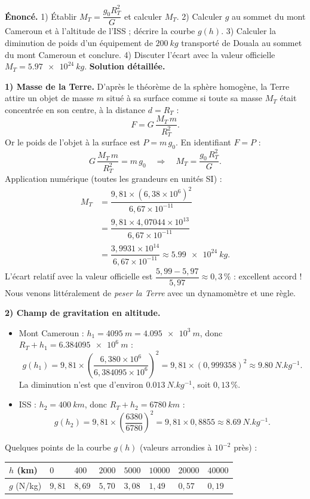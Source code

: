 \documentclass[11pt]{article}
\begin{document}
\begin{exoresolu}
\textbf{Énoncé.} 1) Établir $M_T = \dfrac{g_0 R_T^2}{G}$ et calculer $M_T$. 2) Calculer $g$ au sommet du mont Cameroun et à l'altitude de l'ISS ; décrire la courbe $g(h)$. 3) Calculer la diminution de poids d'un équipement de $\SI{200}{kg}$ transporté de Douala au sommet du mont Cameroun et conclure. 4) Discuter l'écart avec la valeur officielle $M_T = \SI{5,97e24}{kg}$.
\tcblower
\textbf{Solution détaillée.}

\textbf{1) Masse de la Terre.} D'après le théorème de la sphère homogène, la Terre attire un objet de masse $m$ situé à sa surface comme si toute sa masse $M_T$ était concentrée en son centre, à la distance $d = R_T$ :
\[ F = G\,\dfrac{M_T\,m}{R_T^2}. \]
Or le poids de l'objet à la surface est $P = m\,g_0$. En identifiant $F = P$ :
\[ G\,\dfrac{M_T\,m}{R_T^2} = m\,g_0 \quad \Longrightarrow \quad M_T = \dfrac{g_0\,R_T^2}{G}. \]
Application numérique (toutes les grandeurs en unités SI) :
\begin{align*}
M_T &= \dfrac{9{,}81 \times (6{,}38\times 10^{6})^2}{6{,}67\times 10^{-11}} \\
&= \dfrac{9{,}81 \times 4{,}07044\times 10^{13}}{6{,}67\times 10^{-11}} \\
&= \dfrac{3{,}9931\times 10^{14}}{6{,}67\times 10^{-11}} \approx \SI{5,99e24}{kg}.
\end{align*}
L'écart relatif avec la valeur officielle est $\dfrac{5{,}99-5{,}97}{5{,}97} \approx 0{,}3\,\%$ : excellent accord ! Nous venons littéralement de \emph{peser la Terre} avec un dynamomètre et une règle.

\textbf{2) Champ de gravitation en altitude.}
\begin{itemize}
\item Mont Cameroun : $h_1 = \SI{4095}{m} = \SI{4,095e3}{m}$, donc $R_T + h_1 = \SI{6,384095e6}{m}$ :
\[ g(h_1) = 9{,}81 \times \left(\dfrac{6{,}380\times 10^{6}}{6{,}384095\times 10^{6}}\right)^2 = 9{,}81 \times (0{,}999358)^2 \approx \SI{9,80}{N.kg^{-1}}. \]
La diminution n'est que d'environ $\SI{0,013}{N.kg^{-1}}$, soit $0{,}13\,\%$.
\item ISS : $h_2 = \SI{400}{km}$, donc $R_T + h_2 = \SI{6780}{km}$ :
\[ g(h_2) = 9{,}81 \times \left(\dfrac{6380}{6780}\right)^2 = 9{,}81 \times 0{,}8855 \approx \SI{8,69}{N.kg^{-1}}. \]
\end{itemize}
Quelques points de la courbe $g(h)$ (valeurs arrondies à $10^{-2}$ près) :

\begin{center}
\begin{tabularx}{\linewidth}{|l|X|X|X|X|X|X|X|}\hline
\rowcolor{popblueL}
$h$ (km) & $0$ & $400$ & $2000$ & $5000$ & $10000$ & $20000$ & $40000$ \\ \hline
$g$ (N/kg) & $9,81$ & $8,69$ & $5,70$ & $3,08$ & $1,49$ & $0,57$ & $0,19$ \\ \hline
\end{tabularx}
\end{center}


\end{exoresolu}
\end{document}
